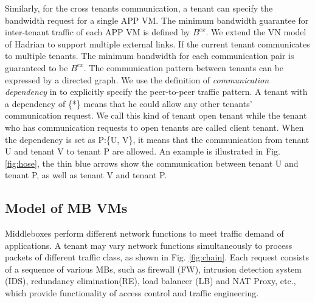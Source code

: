 \documentclass[review]{elsarticle}
\begin{document}
Similarly, for the cross tenants communication, a tenant can specify the bandwidth request for a single APP VM. The minimum bandwidth guarantee for inter-tenant traffic of each APP VM is defined by $B^{ex}$. We extend the VN model of Hadrian \cite{B13cta} to support multiple external links. If the current tenant communicates to multiple tenants. The minimum bandwidth for each communication pair is guaranteed to be $B^{ex}$. The communication pattern between tenants can be expressed by a directed graph. We use the definition of \emph{communication dependency} in \cite{B13cta} to explicitly specify the peer-to-peer traffic pattern. A tenant with a dependency of \{*\} means that he could allow any other tenants' communication request. We call this kind of tenant open tenant while the tenant who has communication requests to open tenants are called client tenant. When the dependency is set as P:\{U, V\}, it means that the communication from tenant U and tenant V to tenant P are allowed. An example is illustrated in Fig. \ref{fig:hose}, the thin blue arrows show the communication between tenant U and tenant P, as well as tenant V and tenant P.




\subsection{Model of MB VMs}\label{sec:modelformb}

Middleboxes perform different network functions to meet traffic demand of applications. A tenant may vary network functions simultaneously to process packets of different traffic class, as shown in Fig. \ref{fig:chain}. Each request consists of a sequence of various MBs, such as firewall (FW), intrusion detection system (IDS), redundancy elimination(RE), load balancer (LB) and NAT Proxy, etc., which provide functionality of access control and traffic engineering. 
\end{document}
